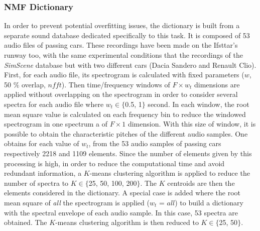 \documentclass[twocolumn]{svjour3}          %
\begin{document}
\subsubsection{NMF Dictionary}\label{part:dictionary_learning}

In order to prevent potential overfitting issues, the dictionary is built from a separate sound database dedicated specifically to this task. It is composed of 53 audio files of passing cars. These recordings have been made on the Ifsttar's runway too, with the same experimental conditions that the recordings of the \textit{SimScene} database but with two different cars (Dacia Sandero and Renault Clio). First, for each audio file, its spectrogram is calculated with fixed parameters ($w$, 50 $\%$ overlap, $nfft$). Then time/frequency windows of $F \times w_t $ dimensions are applied without overlapping on the spectrogram in order to consider several spectra for each audio file where $w_t \in \lbrace$0.5, 1$\rbrace$ second. In each window, the root mean square value is calculated on each frequency bin to reduce the windowed spectrogram in one spectrum a of $F \times 1$ dimension. With this size of window, it is possible to obtain the characteristic pitches of the different audio samples. One obtains for each value of $w_t$, from the 53 audio samples of passing cars respectively 2218 and 1109 elements. Since the number of elements given by this processing is high, in order to reduce the computational time and avoid redundant information, a $K$-means clustering algorithm is applied to reduce the number of spectra to $K \in \lbrace$25, 50, 100, 200$\rbrace$. The $K$ centroids are then the elements considered in the dictionary. A special case is added where the root mean square of \textit{all} the spectrogram is applied ($w_t$ = $all$) to build a dictionary with the spectral envelope of each audio sample. In this case, 53 spectra are obtained. The $K$-means clustering algorithm is then reduced to $K \in \lbrace$25, 50$\rbrace$.
\end{document}
